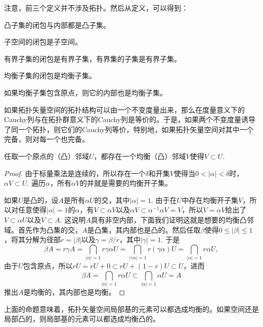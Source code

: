 注意，前三个定义并不涉及拓扑。然后从定义，可以得到：
\begin{compactenum}
\item 凸子集的闭包与内部都是凸子集。
\item 子空间的闭包是子空间。
\item 有界子集的闭包是有界子集，有界集的子集是有界子集。
\item 均衡子集的闭包是均衡子集。
\item 如果均衡子集包含原点，则它的内部也是均衡子集。
\end{compactenum}

如果拓扑矢量空间的拓扑结构可以由一个不变度量出来，那么在度量意义下的Cauchy列与在拓扑群意义下的Cauchy列是等价的。于是，如果两个不变度量诱导了同一个拓扑，则它们的Cauchy列等价，特别地，如果拓扑矢量空间对其中一个完备，则对每一个也完备。

\begin{pro}\label{1.30}
任取一个原点的（凸）邻域$U$，都存在一个均衡（凸）邻域$V$使得$V\subset U$. 
\end{pro}

\begin{proof}
	由于标量乘法是连续的，所以存在一个$\delta$和开集$V$使得当$0<|\alpha|<\delta$时，$\alpha V\subset U$. 遍历$\alpha$，所有$\alpha V$的并就是需要的均衡开子集。

	如果$U$是凸的，设$A$是所有$\alpha U$的交，其中$|\alpha|=1$. 由于在$U$中存在均衡开子集$V$，所以对任意使得$|\alpha|=1$的$\alpha$，有$V\subset \alpha V$以及$\alpha V\subset \alpha^{-1}\alpha V=V$，所以$V=\alpha V$给出了$V\subset \alpha U$以及$V\subset A$. 这说明$A$具有非空内部，下面我们证明这就是想要的均衡凸邻域。首先作为凸集的交，$A$是凸集，其内部也是凸的。然后任取$\beta$使得$0\leq |\beta|\leq 1$，将其分解为径部$r=|\beta|$以及$\gamma=\beta/r$，其中$|\gamma|=1$. 于是
	\[
	\beta A=r\gamma A=\bigcap_{|\alpha|=1}r\gamma\alpha U=\bigcap_{|\gamma\alpha|=1}r(\gamma\alpha) U=\bigcap_{|\alpha|=1}r\alpha U,
	\]
	由于$U$包含原点，所以$rU=rU+0\subset rU+(1-r)U\subset U$，进而
	\[
	\beta A=\bigcap_{|\alpha|=1}r\alpha U\subset \bigcap_{|\alpha|=1}\alpha U=A
	\]
	推出$A$是均衡的，其内部也是均衡。
\end{proof}

上面的命题意味着，拓扑矢量空间局部基的元素可以都选成均衡的。如果空间还是局部凸的，则局部基的元素可以都选成均衡凸的。

